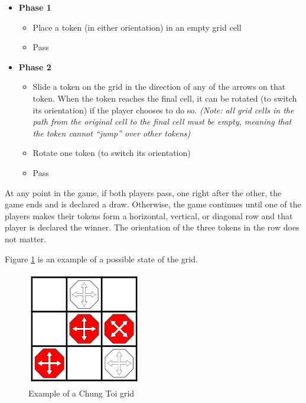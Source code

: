 \documentclass[11pt,a4paper]{report}
\begin{document}
\begin{itemize}

	\item \textbf{Phase 1}
		\begin{itemize}
			\item Place a token (in either orientation) in an empty grid cell
			\item Pass
		\end{itemize}

	\item \textbf{Phase 2}
		\begin{itemize}
			\item Slide a token on the grid in the direction of any of the arrows on that token. When the token reaches the final cell, it can be rotated (to switch its orientation) if the player chooses to do so. \emph{(Note: all grid cells in the path from the original cell to the final cell must be empty, meaning that the token cannot ``jump'' over other tokens)}
			\item Rotate one token (to switch its orientation)
			\item Pass
		\end{itemize}

\end{itemize}

At any point in the game, if both players pass, one right after the other, the game ends and is declared a draw. Otherwise, the game continues until one of the players makes their tokens form a horizontal, vertical, or diagonal row and that player is declared the winner. The orientation of the three tokens in the row does not matter.

Figure \ref{chung-toi-grid-example} is an example of a possible state of the grid.

\begin{figure}[htbp]
	\begin{center}
		\includegraphics[width=50mm]{chung_toi_grid_example.png}
		\caption{Example of a Chung Toi grid\label{chung-toi-grid-example}}
	\end{center}
\end{figure}
\end{document}
